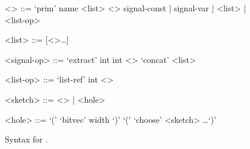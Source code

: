 
\begin{figure}
\setlength{\grammarparsep}{3pt plus 1pt minus 1pt} %
\setlength{\grammarindent}{5em} %
\small{}
\begin{grammar}

<\lowlrir> ::= `prim' name <list> <\lowlrir>
       \alt signal-const | signal-var  | <list> 
        | <list-op>

<list>  ::= [<\lowlrir>\ldots]

<signal-op> ::= `extract' int int <\lowlrir>
         \alt `concat' <list>

<list-op> ::= `list-ref' int <\lowlrir>




<sketch> ::= <\lowlrir> | <hole>

<hole> ::= `(' `bitvec' width `)' 
    \alt `(' `choose' <sketch> \ldots `)'
         
\end{grammar}

\caption{Syntax for \lrir.}
\label{fig:lakeroad-dsl-grammar}
\end{figure}
